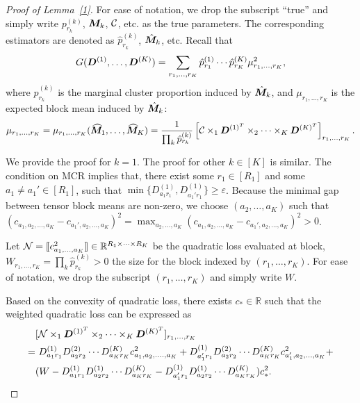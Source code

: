 \documentclass{article}
\begin{document}
\begin{appendices}
\begin{proof}[Proof of Lemma~\ref{1}]
For ease of notation, we drop the subscript ``true'' and simply write $p^{(k)}_{r_k}$, $\bm M_k$, $\mathcal{C}$, etc. as the true parameters. The corresponding estimators are denoted as $\hat p^{(k)}_{r_k}$, $\hat {\bm M}_k$, etc.
Recall that 
\begin{equation}\label{eq:D}
G(\bm{D}^{(1)},\ldots,\bm{D}^{(K)})=\sum_{r_1,\ldots,r_K} \hat p^{(1)}_{r_1}\cdots \hat p^{(K)}_{r_K}  \mu^2_{r_1,\ldots,r_K},
\end{equation}
where  $\hat p^{(k)}_{r_k}$ is the marginal cluster proportion induced by $\hat {\bm M}_k$, and $\mu_{r_1,\ldots,r_K}$ is the expected block mean induced by $\hat {\bm M}_k$:
\[
\mu_{r_1,\ldots,r_K}=\mu_{r_1,\ldots,r_K}(\widehat{\bm M}_1,\ldots,\widehat{\bm M}_K)={1\over \prod_k \hat p^{(k)}_{r_k}}\left[ \mathcal{C}\times_1 \bm{D}^{(1)^T} \times_2\cdots\times_K \bm{D}^{(K)^T}\right]_{r_1,\ldots,r_K}.
\]


We provide the proof for $k=1$. The proof for other $k\in[K]$ is similar. The condition on MCR implies that, there exist some $r_1\in[R_1]$ and some $a_1\neq a_1'\in[R_1]$, such that $\min\{D_{a_1r_1}^{(1)}, D_{a_1'r_1}^{(1)}\}\geq \varepsilon$. Because the minimal gap between tensor block means are non-zero, we choose $(a_2,\ldots,a_K)$ such that $(c_{a_1,a_2,\ldots,a_K}-c_{a_1',a_2,\ldots,a_K})^2 = \displaystyle\max_{a_2,\ldots,a_K}(c_{a_1,a_2,\ldots,a_K}-c_{a_1',a_2,\ldots,a_K})^2>0$. 

Let $\mathcal{N}=\llbracket c^2_{a_1,\ldots,a_K} \rrbracket\in \mathbb{R}^{R_1\times\cdots\times R_K}$ be the quadratic loss evaluated at block, $W_{r_1,\ldots,r_K} = \prod_k \hat p^{(k)}_{r_k} >0$ the size for the block indexed by $(r_1,\ldots,r_K)$. For ease of notation, we drop the subscript ${(r_1,\ldots,r_K)}$ and simply write $W$.

Based on the convexity of quadratic loss, there exists $c_*\in\mathbb{R}$ such that the weighted quadratic loss can be expressed as
\begin{align}
&[\mathcal{N}\times_1\bm{D}^{(1)^T}\times_2\cdots\times_K \bm{D}^{(K)^T}]_{r_1,\ldots,r_K}\\
=&\ D_{a_1r_1}^{(1)}D_{a_2r_2}^{(2)} \cdots D_{a_Kr_K}^{(K)}c^2_{a_1,a_2,\ldots.,a_K}+D_{a_1'r_1}^{(1)}D_{a_2r_2}^{(2)} \cdots D_{a_Kr_K}^{(K)}c^2_{a_1',a_2,\ldots,a_K}+\\
&(W-D_{a_1r_1}^{(1)}D_{a_2r_2}^{(1)}\cdots D_{a_Kr_K}^{(K)}-D_{a_1'r_1}^{(1)}D_{a_2r_2}^{(1)}\cdots D_{a_Kr_K}^{(K)})c^2_*.
\end{align}


\end{proof}
\end{appendices}
\end{document}
